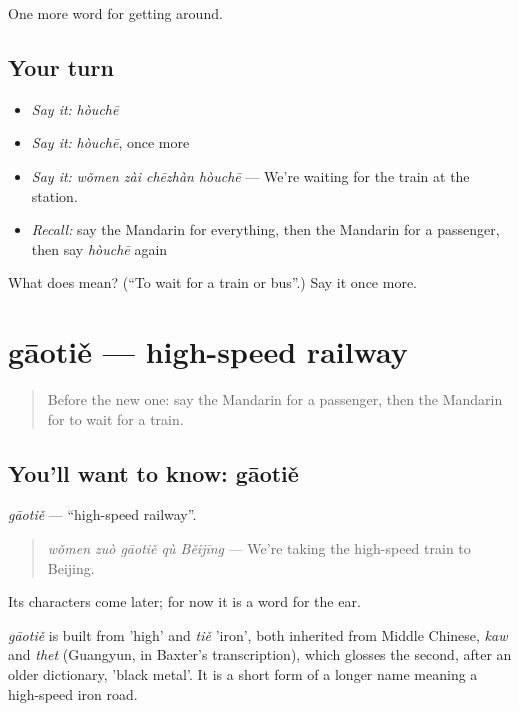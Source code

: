 \begin{grammarlens}[title={What you've built}]
One more word for getting around.
\end{grammarlens}

\subsection*{Your turn}
\begin{itemize}
\raggedright
  \item \emph{Say it:} \emph{hòuchē}
  \item \emph{Say it:} \emph{hòuchē}, once more
  \item \emph{Say it:} \emph{wǒmen zài chēzhàn hòuchē} — We're waiting for the train at the station.
  \item \emph{Recall:} say the Mandarin for everything, then the Mandarin for a passenger, then say \emph{hòuchē} again
\end{itemize}

\begin{tcolorbox}[breakable,colback=teal!4,colframe=teal!35!black,title={Before you move on}]
What does  mean? (\textquotedblleft{}To wait for a train or bus\textquotedblright{}.) Say it once more.
\end{tcolorbox}
\section[gāotiě]{gāotiě — high-speed railway}

\label{lesson:ZH-C402-gaotie}



\begin{quote}
Before the new one: say the Mandarin for a passenger, then the Mandarin for to wait for a train.
\end{quote}

\subsection*{You'll want to know: gāotiě}
\emph{gāotiě} — \textquotedblleft{}high-speed railway\textquotedblright{}.

\begin{quote}
\emph{wǒmen zuò gāotiě qù Běijīng} — We're taking the high-speed train to Beijing.
\end{quote}

Its characters come later; for now it is a word for the ear.

\begin{cousinweb}
\emph{gāotiě} is built from  'high' and \emph{tiě} 'iron', both inherited from Middle Chinese, \emph{kaw} and \emph{thet} (Guangyun, in Baxter's transcription), which glosses the second, after an older dictionary, 'black metal'. It is a short form of a longer name meaning a high-speed iron road.
\end{cousinweb}

